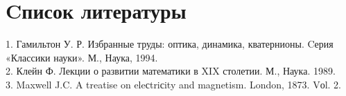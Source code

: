 \documentclass[12 pt, russian]{article}
\begin{document}
\newpage
\section{Cписок литературы}
\label{sec:lit}
1. Гамильтон У. Р. Избранные труды: оптика, динамика, кватернионы. Cерия «Классики науки». М., Наука, 1994. \\
2. Клейн Ф. Лекции о развитии математики в XIX столетии. М., Наука. 1989. \\
3. Maxwell J.C. A treatise on eleсtriсity and magnetism. London, 1873. Vоl. 2. \\
\end{document}
